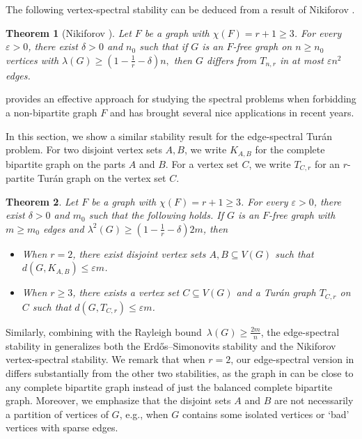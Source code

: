 \documentclass[11pt,a4paper]{article}
\newtheorem{theorem}{Theorem}[section]
\theoremstyle{definition}
\theoremstyle{remark}
\begin{document}
 
The following vertex-spectral stability can be deduced from a result of Nikiforov \cite{Niki2009jgt}. 



\begin{theorem}[Nikiforov \cite{Niki2009jgt}]  
\label{thm-niki-stability}
Let $F$ be a graph with $\chi (F)=r+1\ge 3$. 
For every $\varepsilon >0$, there exist $\delta >0$ 
and $n_0$ such that 
if  $G$ is an $F$-free graph on $n\ge n_0$ vertices  with $\lambda (G) \ge \left(1- \frac{1}{r} -\delta \right)n,$
then $G$ differs from $T_{n,r}$ in at most $\varepsilon n^2$ edges. 
\end{theorem}

 provides an effective approach for 
studying the spectral problems when forbidding a non-bipartite graph $F$ and has brought several nice applications in recent years.

In this section, we show a similar stability result for the edge-spectral Tur\'{a}n problem. 
For two disjoint vertex sets $A,B$, 
we write $K_{A,B}$ for the complete bipartite graph on the parts $A$ and $B$. 
For a vertex set $C$, we write $T_{C,r}$ 
for an $r$-partite Tur\'{a}n graph on the vertex set $C$. 

\begin{theorem} 
\label{thm:nikiforov-stability}
Let $F$ be a graph with $\chi (F)=r+1\ge 3$.  
For every $\varepsilon > 0 $, 
there exist $\delta>0$ and $m_0$ such that the following holds. If $G$ is an $F$-free graph with $m\ge m_0$ edges and $\lambda^2 (G)\ge (1- \frac{1}{r} - \delta) 2m$, then 
\begin{itemize}
\item[\rm (a)] When $r = 2$, there exist disjoint vertex sets $A, B \subseteq V(G)$ such that $d(G, K_{A, B}) \leq \varepsilon m$.

\item[\rm (b)]
 When $r \geq 3$, there exists a vertex set $C \subseteq V(G)$ and a Tur\'{a}n graph $T_{C, r}$ on $C$ such that $d(G, T_{C, r}) \leq \varepsilon m$. 
 \end{itemize}
\end{theorem}

Similarly, combining with the Rayleigh bound~$\lambda(G)\ge \frac{2m}{n}$, the edge-spectral stability in  generalizes both the Erd\H{o}s--Simonovits stability and the Nikiforov vertex-spectral stability.
We remark that when $r = 2$, our edge-spectral version in  differs substantially from the other two stabilities, as the graph in  can be close to any complete bipartite graph instead of just the balanced complete bipartite graph. Moreover, we emphasize that the disjoint sets $A$ and $B$ are not necessarily a partition of vertices of $G$, e.g., when $G$ contains some isolated vertices or `bad' vertices with sparse edges.
\end{document}
